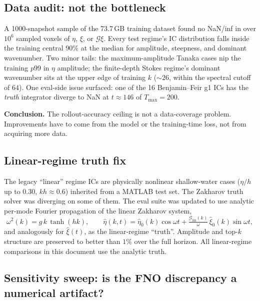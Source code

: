 \documentclass[11pt,letterpaper]{article}
\newcommand{\Gop}{\mathcal{G}}
\begin{document}
\subsection{Data audit: not the bottleneck}

A 1000-snapshot sample of the 73.7\,GB training dataset found no
NaN/inf in over $10^{6}$ sampled voxels of $\eta$, $\xi$, or $\Gop\xi$.
Every test regime's IC distribution falls inside the training central
90\% at the median for amplitude, steepness, and dominant wavenumber.
Two minor tails: the maximum-amplitude Tanaka cases nip the training
$p99$ in $\eta$ amplitude; the finite-depth Stokes regime's dominant
wavenumber sits at the upper edge of training $k$ ($\sim 26$, within
the spectral cutoff of $64$). One eval-side issue surfaced: one of the
16 Benjamin--Feir g1 ICs has the \emph{truth} integrator diverge to
NaN at $t \approx 146$ of $T_{\max} = 200$.

\textbf{Conclusion.} The rollout-accuracy ceiling is not a data-coverage
problem. Improvements have to come from the model or the training-time
loss, not from acquiring more data.

\subsection{Linear-regime truth fix}

The legacy ``linear'' regime ICs are physically nonlinear shallow-water
cases ($\eta/h$ up to $0.30$, $kh \approx 0.6$) inherited from a MATLAB
test set. The Zakharov truth solver was diverging on some of them. The
eval suite was updated to use analytic per-mode Fourier propagation of
the linear Zakharov system,
\[
\omega^{2}(k) = g\,k\,\tanh(hk),\qquad
\hat\eta(k,t) = \hat\eta_{0}(k)\cos\omega t + \tfrac{\Gop_{\mathrm{lin}}(k)}{\omega}\,\hat\xi_{0}(k)\sin\omega t,
\]
and analogously for $\hat\xi(t)$, as the linear-regime ``truth''. Amplitude
and top-$k$ structure are preserved to better than $1\%$ over the full
horizon. All linear-regime comparisons in this document use the analytic
truth.

\subsection{Sensitivity sweep: is the FNO discrepancy a numerical artifact?}
\label{sec:sensitivity}
\end{document}
